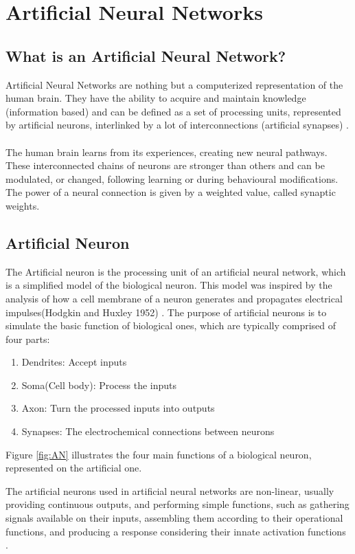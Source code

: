 \section{Artificial Neural Networks}
\subsection{What is an Artificial Neural Network?}
Artificial Neural Networks are nothing but a computerized representation of the human brain. 
They have the ability to acquire and maintain knowledge (information based) and can be defined as a set of processing units, represented by artificial neurons,
interlinked by a lot of interconnections
(artificial synapses) \cite[p.~5]{Silva2016}.\\\\
The human brain learns from its experiences, creating new neural pathways. These interconnected chains of neurons are stronger than others and can be modulated, or changed,
following learning or during behavioural modifications.
The power of a neural connection is given by a weighted value, called synaptic weights.

\subsection{Artificial Neuron}
The Artificial neuron is the processing unit of an artificial neural network, which is a simplified model of the biological neuron.
This model was inspired by the analysis of how a cell membrane of a neuron generates and propagates electrical impulses(Hodgkin and Huxley 1952) \cite[p.~11]{Silva2016}.
The purpose of artificial neurons is to simulate the basic function of biological ones,
which are typically comprised of four parts:

\begin{enumerate}
	\item Dendrites: Accept inputs
	\item Soma(Cell body): Process the inputs
	\item Axon: Turn the processed inputs into outputs
	\item Synapses: The electrochemical connections between neurons 
\end{enumerate}
Figure \ref{fig:AN} illustrates the four main functions of a biological neuron, represented on the artificial one. 

The artificial neurons used in artificial neural networks are non-linear, usually providing continuous outputs,
and performing simple functions,
such as gathering signals available on their inputs,
assembling them according to their operational functions,
and producing a response considering their innate activation functions \cite[p.~11]{Silva2016}. 

